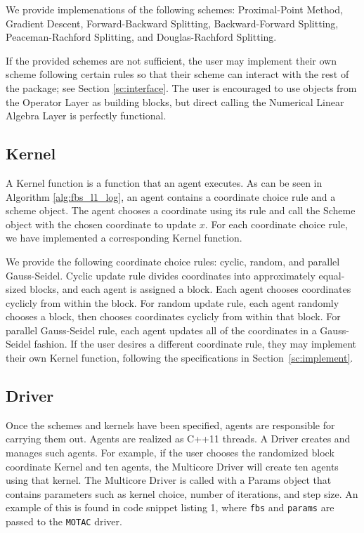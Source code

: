 We provide implemenations of the following schemes:  Proximal-Point Method,  Gradient Descent, Forward-Backward Splitting, Backward-Forward Splitting, Peaceman-Rachford Splitting, and Douglas-Rachford Splitting.

If the provided schemes are not sufficient, the user may implement their own scheme following certain rules so that their scheme can interact with the rest of the package; see Section \ref{sc:interface}.
The user is encouraged to use objects from the Operator Layer as building blocks, but direct calling the Numerical Linear Algebra Layer is perfectly functional. %

\subsection{Kernel}
A Kernel function is a function that an agent executes.
As can be seen in Algorithm \ref{alg:fbs_l1_log}, an agent contains a coordinate choice rule and a scheme object.
The agent chooses a coordinate using its rule and call the Scheme object with the chosen coordinate to update $x$.
For each coordinate choice rule, we have implemented a corresponding Kernel function.

We provide the following coordinate choice rules: cyclic, random, and parallel Gauss-Seidel. 
Cyclic update rule divides coordinates into approximately equal-sized blocks, and each agent is assigned a block.
Each agent chooses coordinates cyclicly from within the block. 
For random update rule, each agent randomly chooses a block, then chooses coordinates cyclicly from within that block.
For parallel Gauss-Seidel rule, each agent updates all of the coordinates in a Gauss-Seidel fashion. 
If the user desires a different coordinate rule, they may implement their own Kernel function, following the specifications in Section~\ref{sc:implement}.


\subsection{Driver}

Once the schemes and kernels have been specified, agents are responsible for carrying them out. Agents are realized as C++11 threads.
A Driver creates and manages such agents.
For example, if the user chooses the randomized block coordinate Kernel and ten agents, the Multicore Driver will create ten agents using that kernel. %
The Multicore Driver is called with a Params object that contains parameters such as kernel choice, number of iterations, and step size.
An example of this is found in code snippet listing 1, where \texttt{fbs} and \texttt{params} are passed to the \texttt{MOTAC} driver.


